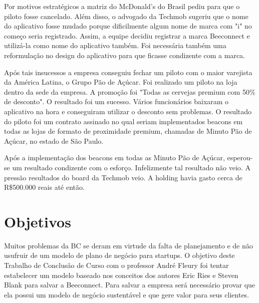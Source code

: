 Por motivos estratégicos a matriz do McDonald's do Brasil pediu para que o piloto fosse cancelado. Além disso, o advogado da Techmob sugeriu que o nome do aplicativo fosse mudado porque dificilmente algum nome de marca com "i" no começo seria registrado. Assim, a equipe decidiu registrar a marca Beeconnect e utilizá-la como nome do aplicativo também. Foi necessária também uma reformulação no design do aplicativo para que ficasse condizente com a marca.

Após tais insucessos a empresa conseguiu fechar um piloto com o maior varejista da América Latina, o Grupo Pão de Açúcar. Foi realizado um piloto na loja dentro da sede da empresa. A promoção foi "Todas as cervejas premium com 50\% de desconto". O resultado foi um sucesso. Vários funcionários baixaram o aplicativo na hora e conseguiram utilizar o desconto sem problemas. O resultado do piloto foi um contrato assinado no qual seriam implementados beacons em todas as lojas de formato de proximidade premium, chamadas de Minuto Pão de Açúcar, no estado de São Paulo.

Após a implementação dos beacons em todas as Minuto Pão de Açúcar, esperou-se um resultado condizente com o esforço. Infelizmente tal resultado não veio. A pressão resultados do board da Techmob veio. A holding havia gasto cerca de R\$500.000 reais até então.

\section[Objetivos]{Objetivos}
\label{chap:objetivos}

Muitos problemas da BC se deram em virtude da falta de planejamento e de não usufruir de um modelo de plano de negócio para startups. O objetivo deste Trabalho de Conclusão de Curso com o professor André Fleury foi tentar estabelecer um modelo baseado nos conceitos dos autores Eric Ries e Steven Blank  para salvar a Beeconnect. 
Para salvar a empresa será necessário provar que ela possui um modelo de negócio sustentável e que gere valor para seus clientes.